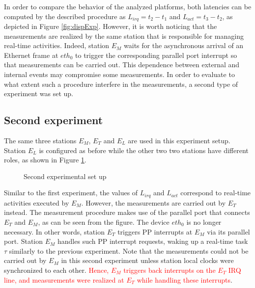 \documentclass{acm_proc_article-sp}
\newcommand{\col}[1]{\textcolor{red}{#1}}
\begin{document}
\begin{figure*}[t!]
  \centering {\scalebox{1}{}}
  \caption{Interrupt and activation latencies measurement at station $E_M$ for the
    second experiment}
  \label{fig:dispExp2}
\end{figure*}

In order to compare the behavior of the analyzed platforms, both latencies can be
computed by the described procedure as $L_{irq} = t_2 - t_1$ and $L_{act} = t_3 -
t_2$, as depicted in Figure \ref{fig:dispExp}. However, it is worth noticing that
the measurements are realized by the same station that is responsible for managing
real-time activities. Indeed, station $E_M$ waits for the asynchronous arrival of an
Ethernet frame at $eth_0$ to trigger the corresponding parallel port interrupt so
that measurements can be carried out. This dependence between external and internal
events may compromise some measurements. In order to evaluate to what extent such a
procedure interfere in the measurements, a second type of experiment was set up.


\subsection{Second experiment}
\label{sec:exp2}

The same three stations $E_M$, $E_T$ and $E_L$ are used in this experiment
setup. Station $E_L$ is configured as before while the other two 
two stations have different roles, as shown in Figure \ref{fig:config2}.

\begin{figure}[htb]
  \centering {\scalebox{1}{}}
  \caption{Second experimental set up}
  \label{fig:config2}
\end{figure}

Similar to the first experiment, the values of $L_{irq}$ and $L_{act}$ correspond
to real-time activities executed by $E_M$. However, the measurements are carried out
by $E_T$ instead. The measurement procedure makes use of the parallel port that
connects $E_T$ and $E_M$, as can be seen from the figure.  The device $eth_0$ is no
longer necessary.  In other words, station $E_T$ triggers PP interrupts at $E_M$ via
its parallel port. Station $E_M$ handles such PP interrupt requests, waking up a
real-time task $\tau$ similarly to the previous experiment. Note that the
measurements could not be carried out by $E_M$ in this second experiment unless
station local clocks were synchronized to each other.  \col{Hence, $E_M$ triggers
  back interrupts on the $E_T$ IRQ line, and measurements were realized at $E_T$
  while handling these interrupts}.
\end{document}

